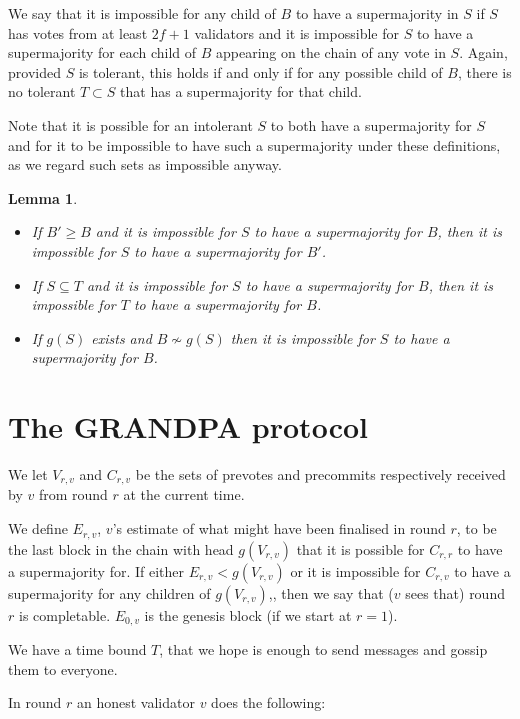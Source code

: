 \documentclass{article}
\newtheorem{lemma}[theorem]{Lemma}
\begin{document}
{We say that it is impossible for any child of $B$ to have a supermajority in $S$ if $S$ has votes from at least $2f+1$ validators and it is impossible for $S$ to have a supermajority for each child of $B$ appearing on the chain of any vote in $S$. Again, provided $S$ is tolerant, this holds if and only if for any possible child of $B$, there is no tolerant $T \subset S$ that has a supermajority for that child.

Note that it is possible for an intolerant $S$ to both have a supermajority for $S$ and for it to be impossible to have such a supermajority under these definitions, as we regard such sets as impossible anyway.

\begin{lemma} \label{lem:impossible}
\begin{itemize}
\item[(i)] If $B' \geq B$ and it is impossible for $S$ to have a supermajority for $B$, then it is impossible for $S$ to have a supermajority for $B'$.
\item[(ii)] If $S \subseteq T$ and it is impossible for $S$ to have a supermajority for $B$, then it is impossible for $T$ to have a supermajority for $B$.
\item[(iii)] If $g(S)$ exists and $B \nsim g(S)$ then it is impossible for $S$ to have a supermajority for $B$.
\end{itemize}
\end{lemma}

\section{The GRANDPA protocol}

We let $V_{r,v}$ and $C_{r,v}$ be the sets of prevotes and precommits respectively received by $v$ from round $r$ at the current time.

We define $E_{r,v}$, $v$'s estimate of what might have been finalised in round $r$, to be the last block in the chain with head $g(V_{r,v})$ that it is possible for $C_{r,r}$ to have a supermajority for. If either $E_{r,v} < g(V_{r,v})$ or it is impossible for $C_{r,v}$ to have a supermajority for any children of $g(V_{r,v})$,, then we say that ($v$ sees that) round $r$ is completable. $E_{0,v}$ is the genesis block (if we start at $r=1$).

We have a time bound $T$, that we hope is enough to send messages and gossip them to everyone. 

In round $r$ an honest validator $v$ does the following:

}
\end{document}

